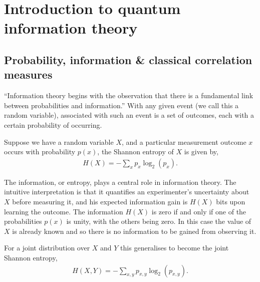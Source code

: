 %
%

\section{Introduction to quantum information theory}



\subsection{Probability, information \& classical correlation measures}

``Information theory begins with the observation that there is a fundamental link between probabilities and information.'' With any given event (we call this a random variable), associated with such an event is a set of outcomes, each with a certain probability of occurring. 

Suppose we have a random variable $X$, and a particular measurement outcome $x$ occurs with probability $p(x)$, the Shannon entropy of $X$ is given by,
\begin{align}
	H(X) = -\sum_x p_x\log_2(p_x).
\end{align}

The information, or entropy, plays a central role in information theory. The intuitive interpretation is that it quantifies an experimenter's uncertainty about $X$ before measuring it, and his expected information gain is $H(X)$ bits upon learning the outcome. The information $H(X)$ is zero if and only if one of the probabilities $p(x)$ is unity, with the others being zero. In this case the value of $X$ is already known and so there is no information to be gained from observing it.  

For a joint distribution over $X$ and $Y$ this generalises to become the joint Shannon entropy,
\begin{align}
H(X,Y) = -\sum_{x,y} p_{x,y}\log_2(p_{x,y}).
\end{align}

